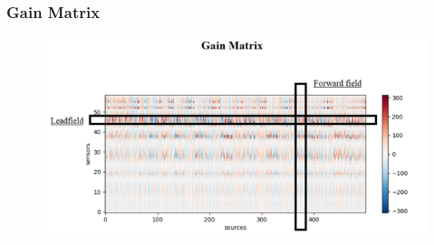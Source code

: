 \documentclass{beamer}
\numberwithin{figure}{section}
\numberwithin{equation}{section}
\begin{document}


\section{}
\begin{frame}
 \frametitle{Gain Matrix}
 	
 	\begin{figure}[p]
  		\centering
  		\includegraphics[width=1.0\linewidth]{pictures/lf}
  		\label{fig:approaches_RDF}
 	\end{figure}
    
\end{frame}


\end{document}
